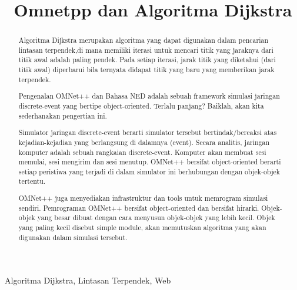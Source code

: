 \documentclass[conference]{IEEEtran}
\begin{document}
\title{Omnetpp dan Algoritma Dijkstra}

\author{
\and

\and
}
\maketitle

\begin{abstract}
    Algoritma Dijkstra merupakan algoritma yang dapat digunakan dalam
    pencarian lintasan terpendek,di mana memiliki iterasi untuk mencari titik yang jaraknya
    dari titik awal adalah paling pendek. Pada setiap iterasi, jarak titik yang diketahui (dari titik
    awal) diperbarui bila ternyata didapat titik yang baru yang memberikan jarak terpendek.
\end{abstract}
\begin{abstract}
Pengenalan OMNet++ dan Bahasa NED
adalah sebuah framework simulasi jaringan discrete-event yang bertipe object-oriented. Terlalu panjang? Baiklah, akan kita sederhanakan pengertian ini.

Simulator jaringan discrete-event berarti simulator tersebut bertindak/bereaksi atas kejadian-kejadian yang berlangsung di dalamnya (event). Secara analitis, jaringan komputer adalah sebuah rangkaian discrete-event. Komputer akan membuat sesi memulai, sesi mengirim dan sesi menutup. OMNet++ bersifat object-oriented berarti setiap peristiwa yang terjadi di dalam simulator ini berhubungan dengan objek-objek tertentu.

OMNet++ juga menyediakan infrastruktur dan tools untuk memrogram simulasi sendiri. Pemrograman OMNet++ bersifat object-oriented dan bersifat hirarki. Objek-objek yang besar dibuat dengan cara menyusun objek-objek yang lebih kecil. Objek yang paling kecil disebut simple module, akan memutuskan algoritma yang akan digunakan dalam simulasi tersebut.
\end{abstract}
\begin{IEEEkeywords}
    Algoritma Dijkstra, Lintasan Terpendek, Web
\end{IEEEkeywords}
\end{document}
